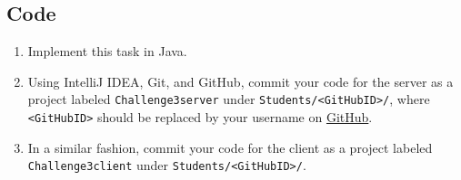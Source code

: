 \documentclass[11pt]{article}
\begin{document}
\subsection*{Code}

\begin{enumerate}
\item Implement this task in Java.
\item Using IntelliJ IDEA, Git, and GitHub, commit your code for the server as a project labeled \texttt{Challenge3server} under \texttt{Students/<GitHubID>/}, where \texttt{<GitHubID>} should be replaced by your username on \href{https://GitHub.com}{GitHub}.
\item In a similar fashion, commit your code for the client as a project labeled \texttt{Challenge3client} under \texttt{Students/<GitHubID>/}.
\end{enumerate}
\end{document}
